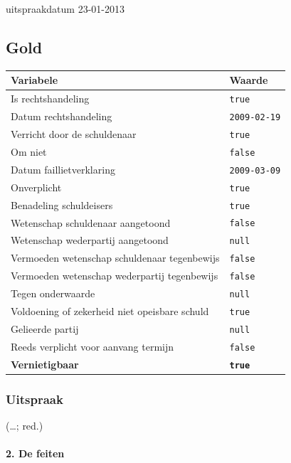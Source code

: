\documentclass[
  dutch,
  a4paper,
]{article}
\begin{document}
uitspraakdatum 23-01-2013

\subsection{Gold}\label{gold-9}

\begin{center}
\small
\begin{tabular}{@{}p{8cm}p{2.6cm}@{}}
\toprule
Variabele & Waarde \\
\midrule
Is rechtshandeling & \texttt{true} \\
Datum rechtshandeling & \texttt{2009-02-19} \\
Verricht door de schuldenaar & \texttt{true} \\
Om niet & \texttt{false} \\
Datum faillietverklaring & \texttt{2009-03-09} \\
Onverplicht & \texttt{true} \\
Benadeling schuldeisers & \texttt{true} \\
Wetenschap schuldenaar aangetoond & \texttt{false} \\
Wetenschap wederpartij aangetoond & \texttt{null} \\
Vermoeden wetenschap schuldenaar tegenbewijs & \texttt{false} \\
Vermoeden wetenschap wederpartij tegenbewijs & \texttt{false} \\
Tegen onderwaarde & \texttt{null} \\
Voldoening of zekerheid niet opeisbare schuld & \texttt{true} \\
Gelieerde partij & \texttt{null} \\
Reeds verplicht voor aanvang termijn & \texttt{false} \\
\textbf{Vernietigbaar} & \textbf{\texttt{true}} \\
\bottomrule
\end{tabular}
\end{center}

\subsubsection{Uitspraak}\label{uitspraak-9}

(\ldots; red.)

\paragraph{2. De feiten}\label{de-feiten-3}
\end{document}
